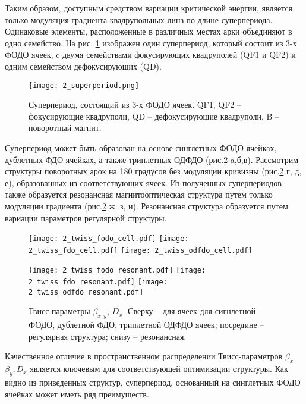 \noindent Таким образом, доступным средством вариации критической энергии, является только модуляция градиента квадрупольных линз по длине суперпериода. Одинаковые элементы, расположенные в различных местах арки объединяют в одно семейство. На рис. \ref{fig:superperiod_3FODO} изображен один суперпериод, который состоит из 3-х ФОДО ячеек, c двумя семействами фокусирующих квадруполей (QF1 и QF2) и одним семейством дефокусирующих (QD).

\begin{figure} [h!]
   \texttt{[image: 2\_superperiod.png]}
   \caption{Суперпериод, состоящий из 3-х ФОДО ячеек. QF1, QF2 -- фокусирующие квадруполи, QD -- дефокусирующие квадруполи, B -- поворотный магнит.}
   \label{fig:superperiod_3FODO}
\end{figure}
	
\par Суперпериод может быть образован на основе синглетных ФОДО ячейках, дублетных ФДО ячейках, а также триплетных ОДФДО (рис.\ref{fig:fodo_fdo_odfdo} a,б,в). Рассмотрим структуры поворотных арок на 180 градусов без модуляции кривизны (рис.\ref{fig:fodo_fdo_odfdo} г, д, е), образованных из соответствующих ячеек. Из полученных суперпериодов также образуется резонансная магнитооптическая структура путем только модуляции градиента (рис.\ref{fig:fodo_fdo_odfdo} ж, з, и). Резонансная структура образуется путем вариации параметров регулярной структуры.

\begin{figure} [h!]

   \texttt{[image: 2\_twiss\_fodo\_cell.pdf]}
   \texttt{[image: 2\_twiss\_fdo\_cell.pdf]}
   \texttt{[image: 2\_twiss\_odfdo\_cell.pdf]}

   \texttt{[image: 2\_twiss\_fodo\_resonant.pdf]}
   \texttt{[image: 2\_twiss\_fdo\_resonant.pdf]}
   \texttt{[image: 2\_twiss\_odfdo\_resonant.pdf]}

   \caption{Твисс-параметры $\beta_{x,y}$, $D_{x}$. Сверху -- для ячеек для сигнлетной ФОДО, дублетной ФДО, триплетной ОДФДО ячеек; посредине -- регулярная структура; снизу -- резонансная.}
   \label{fig:fodo_fdo_odfdo}
\end{figure}

\par Качественное отличие в пространственном распределении Твисс-параметров $\beta_{x}$, $\beta_{y}, D_{x}$ является ключевым для соответствующей оптимизации структуры.
Как видно из приведенных структур, суперпериод, основанный на синглетных ФОДО ячейках может иметь ряд преимуществ.

